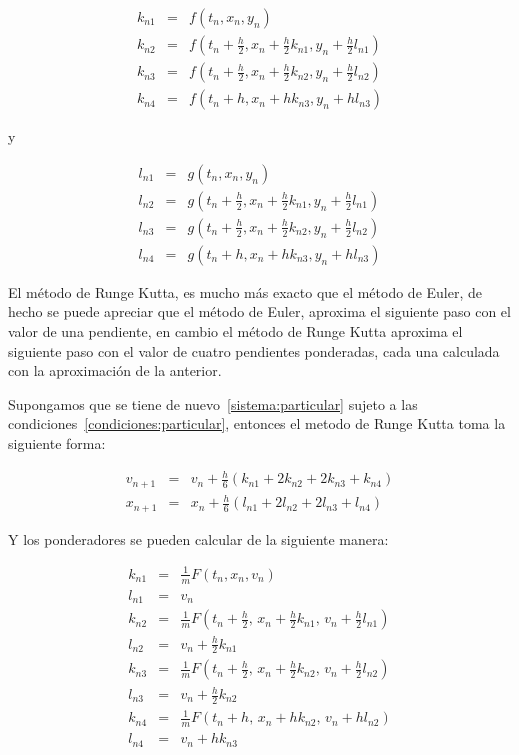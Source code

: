 \begin{eqnarray}
k_{n1} & = & f(t_n, x_n, y_n) \nonumber \\
k_{n2} & = & f(t_n + \frac{h}{2}, x_n + \frac{h}{2} k_{n1}, y_n + \frac{h}{2}l_{n1}) \nonumber \\
k_{n3} & = & f(t_n + \frac{h}{2}, x_n + \frac{h}{2} k_{n2}, y_n + \frac{h}{2}l_{n2}) \nonumber \\
k_{n4} & = & f(t_n + h, x_n + hk_{n3}, y_n + hl_{n3}) \nonumber
\end{eqnarray}

y

\begin{eqnarray}
l_{n1} & = & g(t_n, x_n, y_n) \nonumber \\
l_{n2} & = & g(t_n + \frac{h}{2}, x_n + \frac{h}{2} k_{n1}, y_n + \frac{h}{2}l_{n1}) \nonumber \\
l_{n3} & = & g(t_n + \frac{h}{2}, x_n + \frac{h}{2} k_{n2}, y_n + \frac{h}{2}l_{n2}) \nonumber \\
l_{n4} & = & g(t_n + h, x_n + hk_{n3}, y_n + hl_{n3}) \nonumber
\end{eqnarray}


El método de Runge Kutta, es mucho más exacto que el método de Euler, de hecho se puede apreciar que el método de Euler, aproxima el siguiente paso con el valor de una pendiente, en cambio el método de Runge Kutta aproxima el siguiente paso con el valor de cuatro pendientes ponderadas, cada una calculada con la aproximación de la anterior.

Supongamos que se tiene de nuevo~\ref{sistema:particular} sujeto a las condiciones~\ref{condiciones:particular}, entonces el metodo de Runge Kutta toma la siguiente forma:

\begin{eqnarray}
v_{n+1} & = & v_n + \frac{h}{6}(k_{n1} + 2k_{n2} + 2k_{n3} + k_{n4}) \nonumber \\
x_{n+1} & = & x_n + \frac{h}{6}(l_{n1} + 2l_{n2} + 2l_{n3} + l_{n4})
\label{formulas:RK4}
\end{eqnarray}

Y los ponderadores se pueden calcular de la siguiente manera:

\begin{eqnarray}
k_{n1} & = & \frac{1}{m}F(t_n, x_n, v_n) \nonumber \\
l_{n1} & = & v_n \nonumber \\
k_{n2} & = & \frac{1}{m}F(t_n + \frac{h}{2}, \, x_n + \frac{h}{2}k_{n1}, \, v_n + \frac{h}{2}l_{n1}) \nonumber \\
l_{n2} & = & v_n + \frac{h}{2}k_{n1} \nonumber \\
k_{n3} & = & \frac{1}{m}F(t_n + \frac{h}{2}, \, x_n + \frac{h}{2}k_{n2}, \, v_n + \frac{h}{2}l_{n2}) \nonumber \\
l_{n3} & = & v_n + \frac{h}{2}k_{n2} \nonumber \\
k_{n4} & = & \frac{1}{m}F(t_n + h, \, x_n +hk_{n2}, \, v_n + hl_{n2}) \nonumber \\
l_{n4} & = & v_n + hk_{n3}
\label{ponderadores:RK4}
\end{eqnarray}

